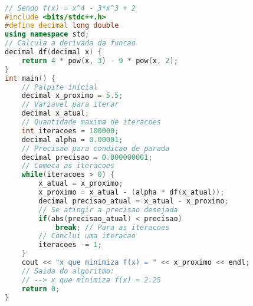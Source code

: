 \begin{lstlisting}[language=C++]

// Sendo f(x) = x^4 - 3*x^3 + 2
#include <bits/stdc++.h>
#define decimal long double
using namespace std;
// Calcula a derivada da funcao
decimal df(decimal x) {
	return 4 * pow(x, 3) - 9 * pow(x, 2);
}
int main() {
	// Palpite inicial
	decimal x_proximo = 5.5;
	// Variavel para iterar
	decimal x_atual;
	// Quantidade maxima de iteracoes
	int iteracoes = 100000;
	decimal alpha = 0.00001;
	// Precisao para condicao de parada
	decimal precisao = 0.000000001;
	// Comeca as iteracoes
	while(iteracoes > 0) {
		x_atual = x_proximo;
		x_proximo = x_atual - (alpha * df(x_atual));
		decimal precisao_atual = x_atual - x_proximo;
		// Se atingir a precisao desejada
		if(abs(precisao_atual) < precisao)
			break; // Para as iteracoes
		// Conclui uma iteracao
		iteracoes -= 1;
	}
	cout << "x que minimiza f(x) = " << x_proximo << endl;
	// Saida do algoritmo:
	// --> x que minimiza f(x) = 2.25
	return 0;
}


\end{lstlisting}
